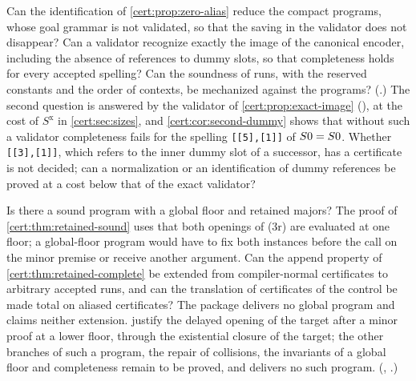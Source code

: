 \begin{question}
Can the identification of \cref{cert:prop:zero-alias} reduce the compact
programs, whose goal grammar is not validated, so that the saving in the
validator does not disappear? Can a validator recognize exactly the image of the
canonical encoder, including the absence of references to dummy slots, so that
completeness holds for every accepted spelling? Can the soundness of runs,
with the reserved constants and the order of contexts, be mechanized against
the programs? (.) The second question is answered by the validator of
\cref{cert:prop:exact-image} (), at the cost of
$S^{\mathrm x}$ in \cref{cert:sec:sizes}, and \cref{cert:cor:second-dummy} shows that
without such a validator completeness fails for the spelling \texttt{[[5],[1]]} of
$S 0=S 0$. Whether \texttt{[[3],[1]]}, which refers to the inner dummy slot of a
successor, has a certificate is not decided; can a normalization or an identification
of dummy references be proved at a cost below that of the exact validator?
\end{question}

\begin{question}
Is there a sound program with a global floor and retained majors? The proof of
\cref{cert:thm:retained-sound} uses that both openings of (3r) are evaluated
at one floor; a global-floor program would have to fix both instances before
the call on the minor premise or receive another argument. Can the append
property of \cref{cert:thm:retained-complete} be extended from compiler-normal
certificates to arbitrary accepted runs, and can the translation of
certificates of the control be made total on aliased certificates? The
package delivers no global program and claims neither extension.
 justify the
delayed opening of the target after a minor proof at a lower floor, through the
existential closure of the target; the other branches of such a program, the
repair of collisions, the invariants of a global floor and completeness remain
to be proved, and  delivers no such program.
(, .)
\end{question}


